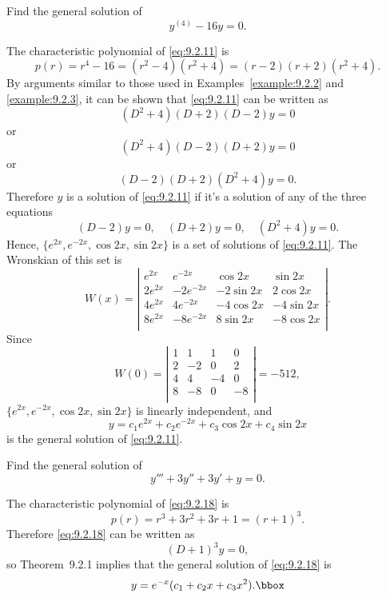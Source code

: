 \setcounter{example}{3}
\setcounter{equation}{10}
\begin{example}
  \label{example:9.2.4} \rm Find the general solution of
  \begin{equation}
    \label{eq:9.2.11}y^{(4)}-16y=0.
  \end{equation}
\end{example}
\begin{examplesolution}
\solution The characteristic polynomial of \eqref{eq:9.2.11} is
\[
  p(r)=r^{4}-16=(r^{2}-4)(r^{2}+4)=(r-2)(r+2)(r^{2}+4).
\]
By arguments similar to those used in Examples~\ref{example:9.2.2} and \ref{example:9.2.3}, it can
be shown that \eqref{eq:9.2.11} can be written as
\[
  (D^{2}+4)(D+2)(D-2)y=0
\]
or
\[
  (D^{2}+4)(D-2)(D+2)y=0
\]
or
\[
  (D-2)(D+2)(D^{2}+4)y=0.
\]
Therefore $y$ is a solution of \eqref{eq:9.2.11} if it's a solution of any of the three equations
\[
  (D-2)y=0,\quad(D+2)y=0,\quad(D^{2}+4)y=0.
\]
Hence, $\{e^{2x},e^{-2x},\cos2x,\sin2x\}$ is a set of solutions of \eqref{eq:9.2.11}. The Wronskian
of this set is
\[
  W(x)=\left|
  \begin{array}{rrrr}
    e^{2x}  & e^{-2x}   & \cos2x   & \sin2x   \\
    2e^{2x} & -2e^{-2x} & -2\sin2x & 2\cos2x  \\
    4e^{2x} & 4e^{-2x}  & -4\cos2x & -4\sin2x \\
    8e^{2x} & -8e^{-2x} & 8\sin2x  & -8\cos2x \\
  \end{array}\right|.
\]
Since
\[
  W(0)=\left|
  \begin{array}{rrrr}
    1 & 1  & 1  & 0  \\
    2 & -2 & 0  & 2  \\
    4 & 4  & -4 & 0  \\
    8 & -8 & 0  & -8 \\
  \end{array}\right|=-512,
\]
$\{e^{2x},e^{-2x},\cos2x,\sin2x\}$ is linearly independent, and
\[
  y=c_{1}e^{2x}+c_{2}e^{-2x}+c_{3}\cos2x+c_{4}\sin2x
\]
is the general solution of \eqref{eq:9.2.11}.
\end{examplesolution}

\setcounter{example}{4}
\setcounter{equation}{17}
\begin{example}
  \label{example:9.2.5} \rm Find the general solution of
  \begin{equation}
    \label{eq:9.2.18}y'''+3y''+3y'+y=0.
  \end{equation}
\end{example}
\begin{examplesolution}
\solution The characteristic polynomial of \eqref{eq:9.2.18} is
\[
  p(r)=r^{3}+3r^{2}+3r+1=(r+1)^{3}.
\]
Therefore \eqref{eq:9.2.18} can be written as
\[
  (D+1)^{3}y=0,
\]
so Theorem~9.2.1 implies that the general solution of \eqref{eq:9.2.18} is
\[
  y=e^{-x}(c_{1}+c_{2}x+c_{3}x^{2}).\bbox
\]
\end{examplesolution}

